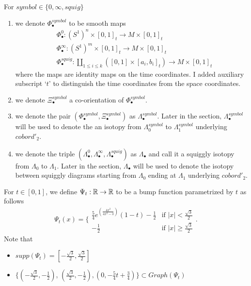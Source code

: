 \begin{definition}
For $symbol\in\{0,\infty, squig \}$
\begin{enumerate}
\item we denote $\Phi_\bullet^{symbol}$ to be smooth maps
\begin{align*}
&\Phi_\bullet^0 : (S^1)^n \times [0,1]_t \rightarrow M \times [0,1]_t \\
&\Phi_\bullet^\infty : (S^1)^m \times [0,1]_t \rightarrow M \times [0,1]_t \\
&\Phi_\bullet^{squig} : \coprod_{1\leq i \leq k} ([0,1] \times [a_i,b_i]_t) \rightarrow M \times [0,1]_t
\end{align*}
where the maps are identity maps on the time coordinates. I added auxiliary subscript `$t$' to distinguish the time coordinates from the space coordinates.

\item we denote $\Xi_\bullet^{symbol}$ a co-orientation of $\Phi_\bullet^{symbol}$.

\item we denote the pair $(\Phi_\bullet^{symbol},\Xi_\bullet^{symbol})$ as $\Lambda_\bullet^{symbol}$. Later in the section, $\Lambda_\bullet^{symbol}$ will be used to denote the an isotopy from $\Lambda_0^{symbol}$ to $\Lambda_1^{symbol}$ underlying $cobord'_2$.

\item we denote the triple $(\Lambda_\bullet^{0},\Lambda_\bullet^{\infty},\Lambda_\bullet^{squig})$ as $\Lambda_\bullet$ and call it a squiggly isotopy from $\Lambda_0$ to $\Lambda_1$. Later in the section, $\Lambda_\bullet$ will be used to denote the isotopy between squiggly diagrams starting from $\Lambda_0$ ending at $\Lambda_1$ underlying $cobord'_2$.
\end{enumerate}
\end{definition}

\begin{definition}
For $t \in [0,1]$, we define $\Psi_t: \mathbb{R} \rightarrow \mathbb{R}$ to be a bump function parametrized by $t$ as follows
\[\Psi_t(x)=\bigg\{
\begin{array}{ll}
    \frac{5}{4}e^{(\frac{4x^2}{4x^2 - 3})}(1-t) - \frac{1}{2} & \text{if } |x| < \frac{\sqrt{3}}{2} \\
    -\frac{1}{2} & \text{if } |x| \geq \frac{\sqrt{3}}{2} 
\end{array}
\bigg.
\]
Note that 
\begin{itemize}
\item $supp(\Psi_t) = [-\frac{\sqrt{3}}{2},\frac{\sqrt{3}}{2}]$

\item $\{(-\frac{\sqrt{3}}{2},-\frac{1}{2})$, $(\frac{\sqrt{3}}{2},-\frac{1}{2}),(0,-\frac{5}{4}t + \frac{3}{4})\} \subset Graph(\Psi_t)$
\end{itemize}
\end{definition}

